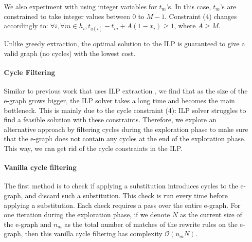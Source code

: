 We also experiment with using integer variables for $t_m$'s. In this case, $t_m$'s are constrained to take integer values between 0 to $M-1$.
Constraint (4) changes accordingly to: $\forall i, \forall m \in h_i, t_{g(i)} - t_m + A (1 - x_i) \geq 1$, where $A \geq M$.

Unlike greedy extraction, the optimal solution to the ILP is guaranteed to give a valid graph (no cycles) with the lowest cost.


\paragraph{Cycle Filtering}
\label{sec:cycle}

Similar to previous work that uses ILP extraction \cite{eqsat, spores},
we find that as the size of the e-graph grows bigger, the ILP solver takes a long time and becomes the main bottleneck.
This is mainly due to the cycle constraint (4): ILP solver struggles to find a feasible solution with these constraints.
Therefore, we explore an alternative approach by filtering cycles during the exploration phase to make sure that the e-graph does not contain any cycles at the end of the exploration phase.
This way, we can get rid of the cycle constraints in the ILP.

\paragraph{Vanilla cycle filtering}
The first method is to check if applying a substitution introduces cycles to the e-graph, and discard such a substitution.
This check is run every time before applying a substitution.
Each check requires a pass over the entire e-graph.
For one iteration during the exploration phase, if we denote $N$ as the current size of the e-graph and $n_m$ as the total number of matches of the rewrite rules on the e-graph, then this vanilla cycle filtering has complexity $\mathcal{O}(n_m N)$.


